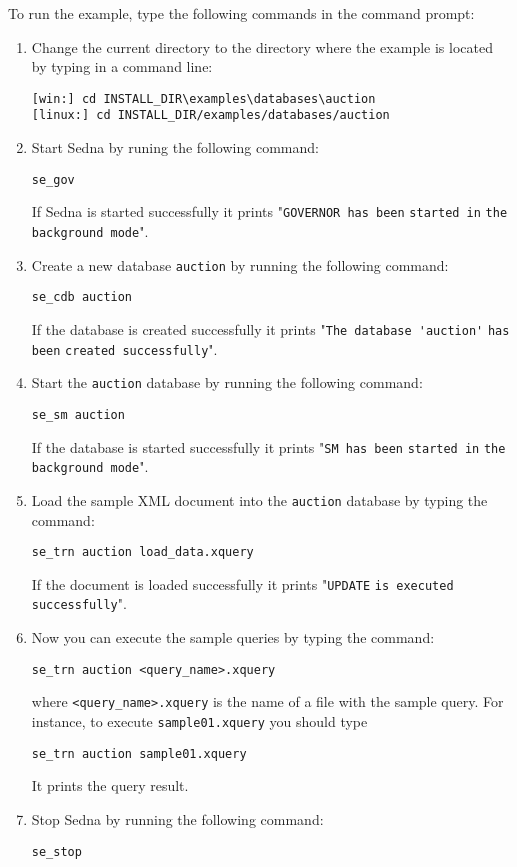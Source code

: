 \documentclass[a4paper,12pt]{article}
\begin{document}
To run the example, type the following commands in the command prompt:
\begin{enumerate}
\item Change the current directory to the directory where the example is located by typing in a command line:
\begin{verbatim}
[win:] cd INSTALL_DIR\examples\databases\auction
[linux:] cd INSTALL_DIR/examples/databases/auction
\end{verbatim}
\item Start Sedna by runing the following command: 
\begin{verbatim}
se_gov 
\end{verbatim}
If Sedna is started successfully it prints "\verb!GOVERNOR has been! \verb!started in! \verb!the background mode!".
\item Create a new database \verb!auction! by running the following command: 
\begin{verbatim}
se_cdb auction
\end{verbatim}
If the database is created successfully it prints "\verb!The database 'auction'! \verb!has been! \verb!created successfully!". 
\item Start the \verb!auction! database by running the following command:
\begin{verbatim}
se_sm auction
\end{verbatim}
If the database is started successfully it prints "\verb!SM has been! \verb!started in! \verb!the background mode!".
\item Load the sample XML document into the \verb!auction! database by typing the command:
\begin{verbatim}
se_trn auction load_data.xquery 
\end{verbatim}
If the document is loaded successfully it prints "\verb!UPDATE! \verb!is executed! \verb!successfully!".
\item Now you can execute the sample queries by typing the command:
\begin{verbatim}
se_trn auction <query_name>.xquery 
\end{verbatim}
where \verb!<query_name>.xquery! is the name of a file with the sample query.
For instance, to execute \verb!sample01.xquery! you should type 
\begin{verbatim}
se_trn auction sample01.xquery
\end{verbatim}
It prints the query result.
\item Stop Sedna by running the following command:
\begin{verbatim}
se_stop
\end{verbatim}
\end{enumerate}
\end{document}
